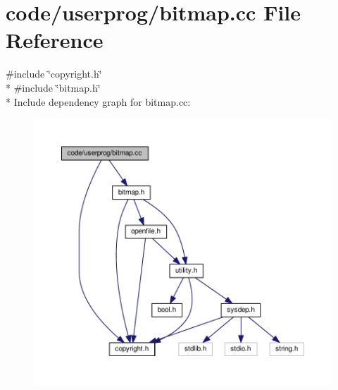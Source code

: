 \section{code/userprog/bitmap.cc File Reference}
\label{bitmap_8cc}
{\ttfamily \#include \char`\"{}copyright.\+h\char`\"{}}\\*
{\ttfamily \#include \char`\"{}bitmap.\+h\char`\"{}}\\*
Include dependency graph for bitmap.\+cc\+:
\nopagebreak
\begin{figure}[H]
\begin{center}
\leavevmode
\includegraphics[width=350pt]{bitmap_8cc__incl}
\end{center}
\end{figure}
